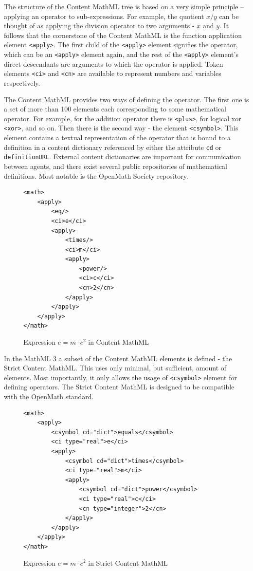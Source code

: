 \documentclass[11pt,oneside,final]{fithesis2}
\begin{document}
The structure of the Content MathML tree is based on a very simple principle – applying an operator to sub-expressions. For example, the quotient $x/y$ can be thought of as applying the division operator to two arguments - $x$ and $y$. It follows that the cornerstone of the Content MathML is the function application element \texttt{<apply>}.  The first child of the \texttt{<apply>} element signifies the operator, which can be an \texttt{<apply>} element again, and the rest of the \texttt{<apply>} element's direct descendants are arguments to which the operator is applied. Token elements \texttt{<ci>} and \texttt{<cn>} are available to represent numbers and variables respectively. 

The Content MathML provides two ways of defining the operator. The first one is a set of more than 100 elements each corresponding to some mathematical operator. For example, for the addition operator there is \texttt{<plus>}, for logical xor \texttt{<xor>}, and so on. Then there is the second way - the element \texttt{<csymbol>}. This element contains a textual representation of the operator that is bound to a definition in a content dictionary referenced by either the attribute \texttt{cd} or \texttt{definitionURL}. External content dictionaries are important for communication between agents, and there exist several public repositories of mathematical definitions. Most notable is the OpenMath Society repository.

\begin{figure}[!ht]
\lstset{language=XML,frame=lines}
\begin{lstlisting}
<math>
	<apply>
		<eq/>
		<ci>e</ci>
		<apply>
			<times/>
			<ci>m</ci>
			<apply>
				<power/>
				<ci>c</ci>
				<cn>2</cn>
			</apply>
		</apply>
	</apply>
</math>
\end{lstlisting}
\caption{Expression $e=m \cdot c^2$ in Content MathML}
\end{figure}

In the MathML 3 a subset of the Content MathML elements is defined - the Strict Content MathML. This uses only minimal, but sufficient, amount of elements. Most importantly, it only allows the usage of \texttt{<csymbol>} element for defining operators. The Strict Content MathML is designed to be compatible with the OpenMath standard.

\begin{figure}[!ht]
\lstset{language=XML,frame=lines}
\begin{lstlisting}
<math>
	<apply>
		<csymbol cd="dict">equals</csymbol>
		<ci type="real">e</ci>
		<apply>
			<csymbol cd="dict">times</csymbol>
			<ci type="real">m</ci>
			<apply>
				<csymbol cd="dict">power</csymbol>
				<ci type="real">c</ci>
				<cn type="integer">2</cn>
			</apply>
		</apply>
	</apply>
</math>
\end{lstlisting}
\caption{Expression $e=m \cdot c^2$ in Strict Content MathML}
\end{figure}
\end{document}
